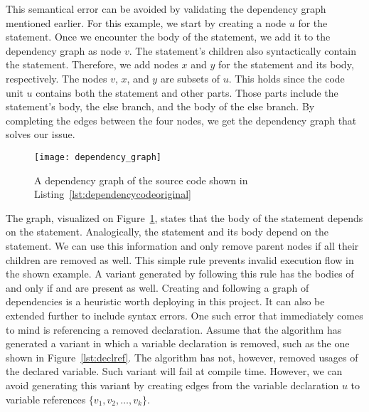 This semantical error can be avoided by validating the dependency graph 
mentioned earlier.
For this example, we start by creating a node $u$ for the  
statement. 
Once we encounter the body of the  statement, we add it to 
the dependency graph as node $v$. 
The  statement's children also syntactically contain 
the  statement. 
Therefore, we add nodes $x$ and $y$ for the  statement and 
its body, respectively. 
The nodes $v$, $x$, and $y$ are subsets of $u$.  
This holds since the code unit $u$ contains both the  
statement and other parts. 
Those parts include the statement's body, the else branch, and the body of 
the else branch. 
By completing the edges between the four nodes, we get the dependency graph 
that solves our issue. 

\begin{figure}[h]\centering
\texttt{[image: dependency\_graph]}
\caption{A dependency graph of the source code shown in 
Listing~\ref{lst:dependencycodeoriginal}}
\label{img:dependencygraph}
\end{figure}

The graph, visualized on Figure~\ref{img:dependencygraph}, states that 
the body of the  statement depends on the  
statement. 
Analogically, the  statement and its body depend on 
the  statement. 
We can use this information and only remove parent nodes if all their 
children are removed as well. 
This simple rule prevents invalid execution flow in the shown example. 
A variant generated by following this rule has the bodies of  
and  only if  and  are 
present as well. 
Creating and following a graph of dependencies is a heuristic worth 
deploying in this project. 
It can also be extended further to include syntax errors. 
One such error that immediately comes to mind is referencing a removed 
declaration. 
Assume that the algorithm has generated a variant in which a variable 
declaration is removed, such as the one shown in Figure~\ref{lst:declref}.
The algorithm has not, however, removed usages of the declared variable. 
Such variant will fail at compile time. 
However, we can avoid generating this variant by creating edges from 
the variable declaration $u$ to variable references
$\{v_1, v_2, \ldots, v_k\}$. 

